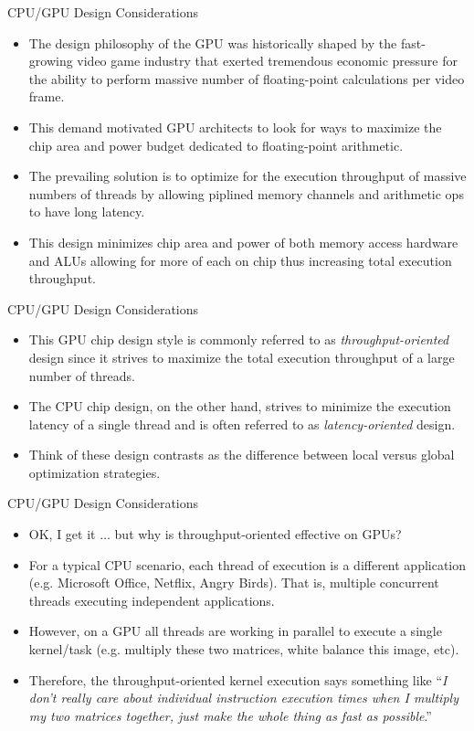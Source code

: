 \documentclass[handout]{beamer}
\begin{document}
\begin{frame}{CPU/GPU Design Considerations}
\begin{itemize}
	\item<1->The design philosophy of the GPU was historically shaped by the fast-growing video game industry that exerted tremendous economic pressure for the ability to perform massive number of floating-point calculations per video frame.
	\item<2->This demand motivated GPU architects to look for ways to maximize the chip area and power budget dedicated to floating-point arithmetic. 
	\item<3->The prevailing solution is to optimize for the execution throughput of massive numbers of threads by allowing piplined memory channels and arithmetic ops to have long latency.
	\item<4->This design minimizes chip area and power of both memory access hardware and ALUs allowing for more of each on chip thus increasing total execution throughput.
\end{itemize}
\end{frame}

\begin{frame}{CPU/GPU Design Considerations}
\begin{itemize}
	\item<1->This GPU chip design style is commonly referred to as \emph{throughput-oriented} design since it strives to maximize the total execution throughput of a large number of threads.
	\item<2-> The CPU chip design, on the other hand, strives to minimize the execution latency of a single thread and is often referred to as \emph{latency-oriented} design.
	\item<3->Think of these design contrasts as the difference between local versus global optimization strategies.
\end{itemize}
\end{frame}

\begin{frame}{CPU/GPU Design Considerations}
\begin{itemize}
	\item<1->OK, I get it $\ldots$  but why is throughput-oriented effective on GPUs?
	\item<2->For a typical CPU scenario, each thread of execution is a different application (e.g. Microsoft Office, Netflix, Angry Birds).  That is, multiple concurrent threads executing independent applications.
	\item<3->However, on a GPU all threads are working in parallel to execute a single kernel/task (e.g. multiply these two matrices, white balance this image, etc). 
	\item<4->Therefore, the throughput-oriented kernel execution says something like ``\emph{I don't really care about individual instruction execution times when I multiply my two matrices together, just make the whole thing as fast as possible}.''
	
\end{itemize}
\end{frame}
\end{document}
